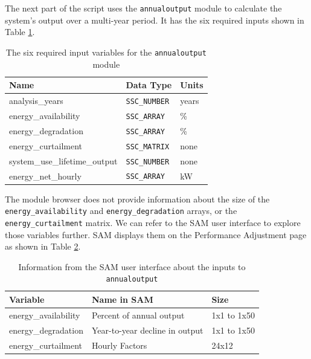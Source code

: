 \documentclass{scrartcl} %
\begin{document}
The next part of the script uses the \texttt{annualoutput} module to calculate the system's output over a multi-year period. It has the six required inputs shown in Table \ref{tab_annualoutput}.

\begin{table}[ht]
\begin{center}
\begin{tabular}{lll}
Name & Data Type & Units \\
\hline
analysis\_years & \texttt{SSC\_NUMBER} & years \\
energy\_availability & \texttt{SSC\_ARRAY} & \% \\
energy\_degradation & \texttt{SSC\_ARRAY} & \% \\
energy\_curtailment & \texttt{SSC\_MATRIX} & none \\
system\_use\_lifetime\_output & \texttt{SSC\_NUMBER} &  none \\
energy\_net\_hourly & \texttt{SSC\_ARRAY} &  kW \\
\end{tabular}
\caption{The six required input variables for the \texttt{annualoutput} module}\label{tab_annualoutput}
\end{center}
\end{table}

The module browser does not provide information about the size of the \texttt{energy\_availability} and \texttt{energy\_degradation} arrays, or the \texttt{energy\_curtailment} matrix. We can refer to the SAM user interface to explore those variables further. SAM displays them on the Performance Adjustment page as shown in Table \ref{tab_performance_adjustment}.

 \begin{table}[ht]
\begin{center}
\begin{tabular}{lll}
Variable & Name in SAM & Size \\
\hline
energy\_availability & Percent of annual output & 1x1 to 1x50 \\
energy\_degradation & Year-to-year decline in output & 1x1 to 1x50 \\
energy\_curtailment & Hourly Factors & 24x12 \\
\end{tabular}
\caption{Information from the SAM user interface about the inputs to \texttt{annualoutput}}\label{tab_performance_adjustment}
\end{center}
\end{table}
\end{document}
